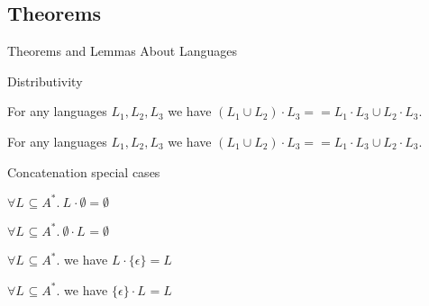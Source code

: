 \documentclass{beamer}
\newcommand{\alphabetSymbol}{A}
\newcommand{\alphabetpow}[1]{\alphabetSymbol^{#1}}
\newcommand{\languagesymbol}{L}
\newcommand{\languagei}[1]{\languagesymbol_{#1}}
\newcommand{\emptyword}{\epsilon}
\newcommand{\concatop}{\cdot}
\newcommand{\unitlang}{\{\emptyword\}}
\begin{document}
\subsection{Theorems}

\begin{frame}
\Huge{Theorems and Lemmas About Languages}
\end{frame}

\begin{frame}{Distributivity}
\begin{theorem}
	\label{lem:clLeftDistributiveAppend}
	For any languages $\languagei{1}, \languagei{2}, \languagei{3}$ we have $(\languagei{1} \cup \languagei{2}) \concatop \languagei{3} == \languagei{1} \concatop \languagei{3} \cup \languagei{2} \concatop \languagei{3}$.
\end{theorem}

\begin{theorem}
	\label{lem:clRightDistributiveAppend}
	For any languages $\languagei{1}, \languagei{2}, \languagei{3}$ we have $(\languagei{1} \cup \languagei{2}) \concatop \languagei{3} == \languagei{1} \concatop \languagei{3} \cup \languagei{2} \concatop \languagei{3}$.
\end{theorem}
\end{frame}

\begin{frame}{Concatenation special cases}
	\begin{theorem}
		$\forall \languagei{} \subseteq \alphabetpow{*}. ~ \languagei{} \concatop \emptyset = \emptyset$
	\end{theorem}
	 {
		
	\begin{theorem}
		$\forall \languagei{} \subseteq \alphabetpow{*}. ~ \emptyset \concatop \languagei{} = \emptyset$
	\end{theorem}
	}
	 {
		
	\begin{theorem}
		\label{the:rightUnitConcat}
		$\forall \languagei{} \subseteq \alphabetpow{*}.$ we have  $\languagei{} \concatop \unitlang = \languagei{}$
	\end{theorem}
	}
	 {
		
	\begin{theorem}
		\label{the:leftUnitConcat}
		$\forall \languagei{} \subseteq \alphabetpow{*}.$ we have $\unitlang \concatop \languagei{} = \languagei{}$
	\end{theorem}
	}
\end{frame}
\end{document}
